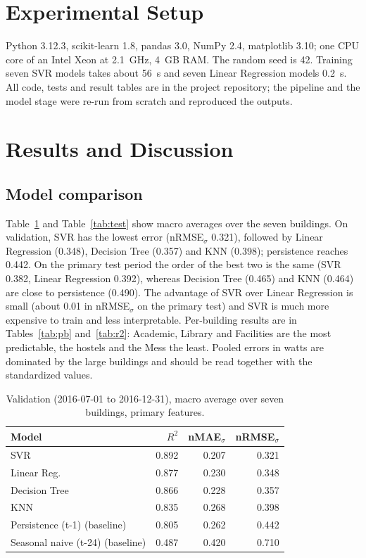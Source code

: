 \documentclass[conference]{IEEEtran}
\begin{document}
\section{Experimental Setup}
Python 3.12.3, scikit-learn 1.8, pandas 3.0, NumPy 2.4, matplotlib 3.10; one CPU core of an Intel Xeon at 2.1~GHz, 4~GB RAM. The random seed is 42. Training seven SVR models takes about 56~s and seven Linear Regression models 0.2~s.
All code, tests and result tables are in the project repository; the pipeline and the model stage were re-run from scratch and reproduced the outputs.

\section{Results and Discussion}
\subsection{Model comparison}
Table~\ref{tab:val} and Table~\ref{tab:test} show macro averages over the seven buildings. On validation, SVR has the lowest error (nRMSE$_\sigma$ 0.321), followed by Linear Regression (0.348), Decision Tree (0.357) and KNN (0.398);
persistence reaches 0.442. On the primary test period the order of the best two is the same (SVR 0.382, Linear Regression 0.392), whereas Decision Tree (0.465) and KNN (0.464) are close to persistence (0.490).
The advantage of SVR over Linear Regression is small (about 0.01 in nRMSE$_\sigma$ on the primary test) and SVR is much more expensive to train and less interpretable.
Per-building results are in Tables~\ref{tab:pb} and~\ref{tab:r2}: Academic, Library and Facilities are the most predictable, the hostels and the Mess the least. Pooled errors in watts are dominated by the large buildings and should be read together with the standardized values.

\begin{table}[t]
\caption{Validation (2016-07-01 to 2016-12-31), macro average over seven buildings, primary features.}\label{tab:val}
\centering\small
\begin{tabular}{lrrr}
\toprule
Model & $R^2$ & nMAE$_\sigma$ & nRMSE$_\sigma$\\
\midrule
SVR & 0.892 & 0.207 & 0.321 \\
Linear Reg. & 0.877 & 0.230 & 0.348 \\
Decision Tree & 0.866 & 0.228 & 0.357 \\
KNN & 0.835 & 0.268 & 0.398 \\
Persistence (t-1) (baseline) & 0.805 & 0.262 & 0.442 \\
Seasonal naive (t-24) (baseline) & 0.487 & 0.420 & 0.710 \\

\bottomrule
\end{tabular}
\end{table}
\end{document}
